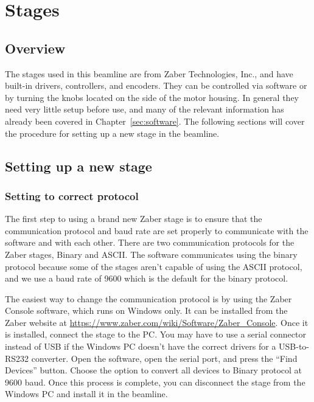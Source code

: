 \chapter{Stages}

\section{Overview}

The stages used in this beamline are from Zaber Technologies, Inc., and have
built-in drivers, controllers, and encoders. They can be controlled via software
or by turning the knobs located on the side of the motor housing. In general
they need very little setup before use, and many of the relevant information has
already been covered in Chapter~\ref{sec:software}. The following sections will
cover the procedure for setting up a new stage in the beamline.

\section{Setting up a new stage}

\subsection{Setting to correct protocol}

The first step to using a brand new Zaber stage is to ensure that the
communication protocol and baud rate are set properly to communicate with the
 software and with each other. There are two communication
protocols for the Zaber stages, Binary and ASCII. The software communicates
using the binary protocol because some of the stages aren't capable of using the
ASCII protocol, and we use a baud rate of 9600 which is the default for the
binary protocol.

The easiest way to change the communication protocol is by using the Zaber
Console software, which runs on Windows only. It can be installed from the Zaber
website at \url{https://www.zaber.com/wiki/Software/Zaber_Console}. Once it is
installed, connect the stage to the PC. You may have to use a serial connector
instead of USB if the Windows PC doesn't have the correct drivers for a
USB-to-RS232 converter. Open the software, open the serial port, and press the
``Find Devices'' button. Choose the option to convert all devices to Binary
protocol at 9600 baud. Once this process is complete, you can disconnect the
stage from the Windows PC and install it in the beamline.  

